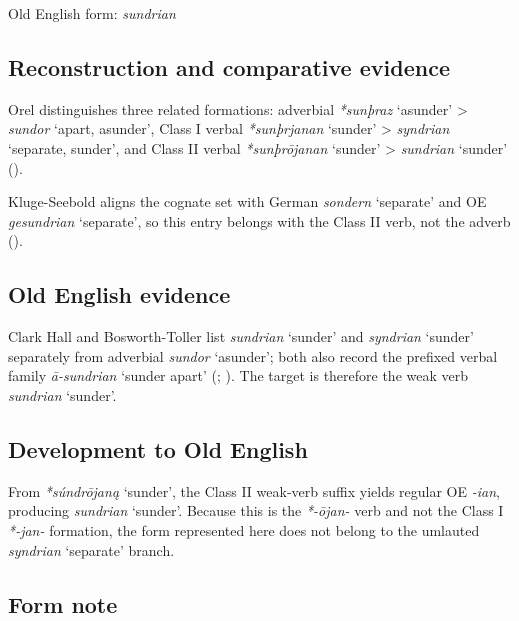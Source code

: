 \documentclass[
  british,
  a4paper,
  openany]{book}
\providecommand{\Recon}[1]{\emph{*#1}}
{\catcode`→=\active \global\def→{\ensuremath{\rightarrow}}}
\providecommand{\Recon}[1]{\emph{*#1}}
{\catcode`→=\active \global\def→{\ensuremath{\rightarrow}}}
\begin{document}
Old English form: \emph{sundrian}

\subsection{Reconstruction and comparative
evidence}\label{reconstruction-and-comparative-evidence-52}

Orel distinguishes three related formations: adverbial \Recon{sunþraz}
`asunder' \textgreater{} {\emph{sundor}} `apart, asunder', Class I
verbal \Recon{sunþrjanan} `sunder' \textgreater{} {\emph{syndrian}}
`separate, sunder', and Class II verbal \Recon{sunþrōjanan} `sunder'
\textgreater{} \emph{sundrian} `sunder' ().

Kluge-Seebold aligns the cognate set with German {\emph{sondern}}
`separate' and OE {\emph{gesundrian}} `separate', so this entry belongs
with the Class II verb, not the adverb
().

\subsection{Old English evidence}\label{old-english-evidence-52}

Clark Hall and Bosworth-Toller list \emph{sundrian} `sunder' and
\emph{syndrian} `sunder' separately from adverbial \emph{sundor}
`asunder'; both also record the prefixed verbal family \emph{ā-sundrian}
`sunder apart' (;
). The target
is therefore the weak verb \emph{sundrian} `sunder'.

\subsection{Development to Old
English}\label{development-to-old-english-52}

From \Recon{súndrōjaną} `sunder', the Class II weak-verb suffix yields
regular OE \emph{-ian}, producing \emph{sundrian} `sunder'. Because this
is the \emph{*-ōjan-} verb and not the Class I \emph{*-jan-} formation,
the form represented here does not belong to the umlauted
{\emph{syndrian}} `separate' branch.

\subsection{Form note}\label{form-note-22}
\end{document}
